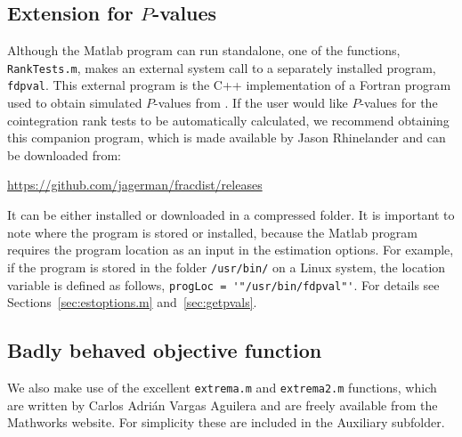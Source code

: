 \documentclass[article]{jss}
\begin{document}
\subsection{Extension for $P$-values}


Although the Matlab program can run standalone, one of the functions, \verb|RankTests.m|, makes an external system call to a separately installed program, \verb|fdpval|. This external program is the C++ implementation of a Fortran program used to obtain simulated $P$-values from \cite{mackinnon2014numerical}. If the user would like $P$-values for the cointegration rank tests to be automatically calculated, we recommend obtaining this companion program, which is made available by Jason Rhinelander and can be downloaded from: 
\begin{center} \url{https://github.com/jagerman/fracdist/releases}
\end{center}
It can be either installed or downloaded in a compressed folder. It is important to note where the program is stored or installed, because the Matlab program requires the program location as an input in the estimation options. For example, if the program is stored in the folder \verb|/usr/bin/| on a Linux system, the location variable is defined as follows, \verb|progLoc = '"/usr/bin/fdpval"'|. For details see Sections~\ref{sec:estoptions.m} and~\ref{sec:getpvals}.

\subsection{Badly behaved objective function}

We also make use of the excellent \verb|extrema.m| and \verb|extrema2.m| functions, which are written by Carlos Adrián Vargas Aguilera and are freely available from the Mathworks website. For simplicity these are included in the Auxiliary subfolder.
\end{document}
